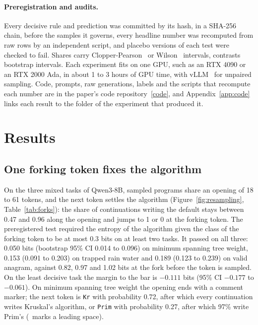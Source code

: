 \documentclass[11pt,letterpaper]{article}
\newcommand{\stok}[1]{\texttt{\textvisiblespace#1}}
\begin{document}
\paragraph{Preregistration and audits.} Every decisive rule and prediction was committed by its hash, in a SHA-256 chain, before the samples it governs, every headline number was recomputed from raw rows by an independent script, and placebo versions of each test were checked to fail. Shares carry Clopper-Pearson~\citep{Clopper1934} or Wilson~\citep{Wilson1927} intervals, contrasts bootstrap intervals. Each experiment fits on one GPU, such as an RTX 4090 or an RTX 2000 Ada, in about 1 to 3 hours of GPU time, with vLLM~\citep{Kwon2023} for unpaired sampling. Code, prompts, raw generations, labels and the scripts that recompute each number are in the paper's code repository~\href{https://github.com/ai-inventor-papers/ai-invention-295f8e-prompt-bans-substitute-not-just-subtract/tree/fork/run_jSassd-YWLVC}{[code]}, and Appendix~\ref{app:code} links each result to the folder of the experiment that produced it.

\section{Results}
\label{sec:results}

\subsection{One forking token fixes the algorithm}
\label{sec:res-fork}

On the three mixed tasks of Qwen3-8B, sampled programs share an opening of 18 to 61 tokens, and the next token settles the algorithm (Figure~\ref{fig:resampling}, Table~\ref{tab:forks}): the share of continuations writing the default stays between 0.47 and 0.96 along the opening and jumps to 1 or 0 at the forking token. The preregistered test required the entropy of the algorithm given the class of the forking token to be at most 0.3 bits on at least two tasks. It passed on all three: 0.050 bits (bootstrap 95\% CI 0.014 to 0.096) on minimum spanning tree weight, 0.153 (0.091 to 0.203) on trapped rain water and 0.189 (0.123 to 0.239) on valid anagram, against 0.82, 0.97 and 1.02 bits at the fork before the token is sampled. On the least decisive task the margin to the bar is $-0.111$ bits (95\% CI $-0.177$ to $-0.061$). On minimum spanning tree weight the opening ends with a comment marker; the next token is \stok{Kr} with probability 0.72, after which every continuation writes Kruskal's algorithm, or \stok{Prim} with probability 0.27, after which 97\% write Prim's (\textvisiblespace\ marks a leading space).
\end{document}
